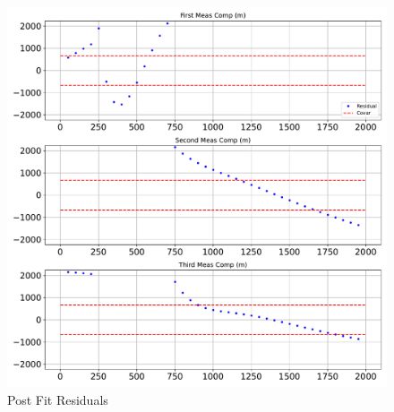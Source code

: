 \begin{figure}[htbp]\centerline{\includegraphics[height=0.9\textwidth, keepaspectratio]{AutoTeX/PostFitUpdate}}\caption{Post Fit Residuals}\label{fig:PostFitUpdate}\end{figure}